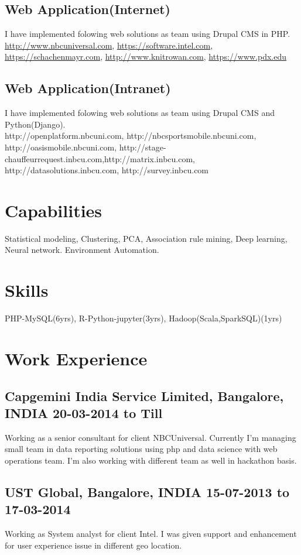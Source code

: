 \documentclass{article}
\begin{document}
\subsection{Web Application(Internet)}
I have implemented folowing web solutions as team using Drupal CMS in PHP.\\
\url{http://www.nbcuniversal.com}, \url{https://software.intel.com}, \url{https://schachenmayr.com}, \url{http://www.knitrowan.com}, \url{https://www.pdx.edu}

\subsection{Web Application(Intranet)}
I have implemented folowing web solutions as team using Drupal CMS and Python(Django).\\
http://openplatform.nbcuni.com, http://nbcsportsmobile.nbcuni.com, http://oasismobile.nbcuni.com, http://stage-chauffeurrequest.inbcu.com,http://matrix.inbcu.com, http://datasolutions.inbcu.com, http://survey.inbcu.com

\section{Capabilities}
Statistical modeling, Clustering, PCA, Association rule mining, Deep learning, Neural network. Environment Automation.

\section{Skills}
PHP-MySQL(6yrs), R-Python-jupyter(3yrs), Hadoop(Scala,SparkSQL)(1yrs)

\section{Work Experience}
\subsection{Capgemini India Service Limited, \textnormal{\small{Bangalore, INDIA \hfill \textbf{20-03-2014 to Till}}}}
Working as a senior consultant for client NBCUniversal. Currently I'm managing small team in data reporting solutions using php and data science with web operations team. I'm also working with different team as well in hackathon basis.
\subsection{UST Global, \textnormal{\small{Bangalore, INDIA \hfill \textbf{15-07-2013 to 17-03-2014}}}}
Working as System analyst for client Intel. I was given support and enhancement for user experience issue in different geo location.
\end{document}
